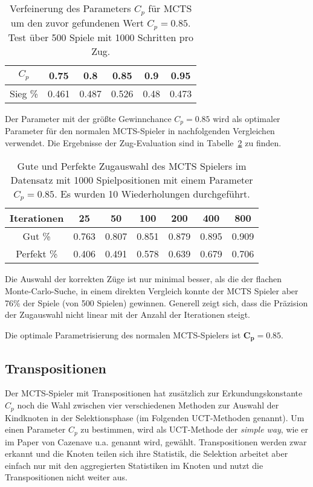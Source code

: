 \medskip
\begin{table}[h!]
\centering
\begin{tabular}{|c||c|c|c|c|c|}
\hline
$C_p$ & 0.75 & 0.8 & 0.85 & 0.9 & 0.95 \\
\hline
Sieg \% & 0.461 & 0.487 & 0.526 & 0.48 & 0.473 \\
\hline
\end{tabular}
\caption{Verfeinerung des Parameters $C_p$ für MCTS um den zuvor gefundenen Wert $C_p=0.85$. Test über 500 Spiele mit 1000 Schritten pro Zug.}
\label{tab:mcts-cp-2}
\end{table}

\medskip
Der Parameter mit der größte Gewinnchance $C_p=0.85$ wird als optimaler Parameter für den normalen MCTS-Spieler in nachfolgenden Vergleichen verwendet. 
Die Ergebnisse der Zug-Evaluation sind in Tabelle~\ref{tab:mcts-move-eval} zu finden.

\begin{table}[h!]
	\centering
	\begin{tabular}{|c||c|c|c|c|c|c|}
		\hline
		Iterationen & 25 & 50 & 100 & 200 & 400 & 800 \\
		\hline
		Gut \% & 0.763 & 0.807 & 0.851 & 0.879 & 0.895 & 0.909 \\
		\hline
		Perfekt \% & 0.406 & 0.491 & 0.578 & 0.639 & 0.679 & 0.706 \\
		\hline
	\end{tabular}
	\caption{Gute und Perfekte Zugauswahl des MCTS Spielers im Datensatz mit 1000 Spielpositionen mit einem Parameter $C_p=0.85$. Es wurden 10 Wiederholungen durchgeführt.}
	\label{tab:mcts-move-eval}
\end{table}

Die Auswahl der korrekten Züge ist nur minimal besser, als die der flachen Monte-Carlo-Suche, in einem direkten Vergleich konnte der MCTS Spieler aber 76\% der Spiele (von 500 Spielen) gewinnen. 
Generell zeigt sich, dass die Präzision der Zugauswahl nicht linear mit der Anzahl der Iterationen steigt.

\bigskip
Die optimale Parametrisierung des normalen MCTS-Spielers ist $\mathbf{C_p=0.85}$.

\pagebreak[2]
\subsection{Transpositionen}

Der MCTS-Spieler mit Transpositionen hat zusätzlich zur Erkundungskonstante $C_p$ noch die Wahl zwischen vier verschiedenen Methoden zur Auswahl der Kindknoten in der Selektionsphase (im Folgenden UCT-Methoden genannt).
Um einen Parameter $C_p$ zu bestimmen, wird als UCT-Methode der \textit{simple way}, wie er im Paper von Cazenave u.a.\autocite{cazenaveUCDUpperConfidence2012} genannt wird, gewählt.
Transpositionen werden zwar erkannt und die Knoten teilen sich ihre Statistik, die Selektion arbeitet aber einfach nur mit den aggregierten Statistiken im Knoten und nutzt die Transpositionen nicht weiter aus.

